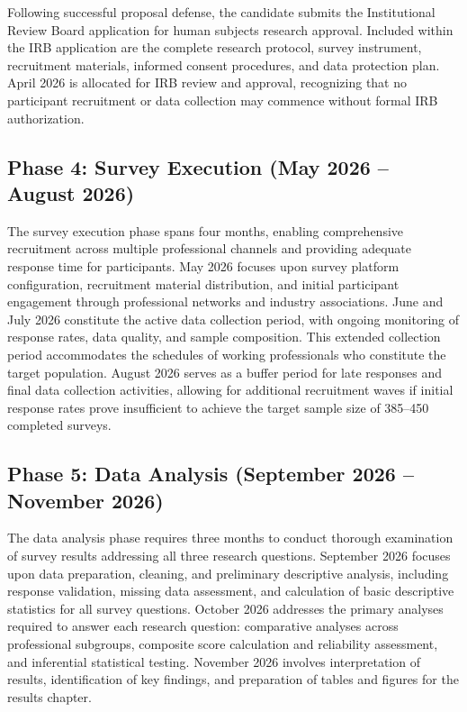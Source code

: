Following successful proposal defense, the candidate submits the Institutional Review Board application for human subjects research approval. Included within the IRB application are the complete research protocol, survey instrument, recruitment materials, informed consent procedures, and data protection plan. April 2026 is allocated for IRB review and approval, recognizing that no participant recruitment or data collection may commence without formal IRB authorization.

\subsection{Phase 4: Survey Execution (May 2026 -- August 2026)}

The survey execution phase spans four months, enabling comprehensive recruitment across multiple professional channels and providing adequate response time for participants. May 2026 focuses upon survey platform configuration, recruitment material distribution, and initial participant engagement through professional networks and industry associations. June and July 2026 constitute the active data collection period, with ongoing monitoring of response rates, data quality, and sample composition. This extended collection period accommodates the schedules of working professionals who constitute the target population. August 2026 serves as a buffer period for late responses and final data collection activities, allowing for additional recruitment waves if initial response rates prove insufficient to achieve the target sample size of 385--450 completed surveys.

\subsection{Phase 5: Data Analysis (September 2026 -- November 2026)}

The data analysis phase requires three months to conduct thorough examination of survey results addressing all three research questions. September 2026 focuses upon data preparation, cleaning, and preliminary descriptive analysis, including response validation, missing data assessment, and calculation of basic descriptive statistics for all survey questions. October 2026 addresses the primary analyses required to answer each research question: comparative analyses across professional subgroups, composite score calculation and reliability assessment, and inferential statistical testing. November 2026 involves interpretation of results, identification of key findings, and preparation of tables and figures for the results chapter.

